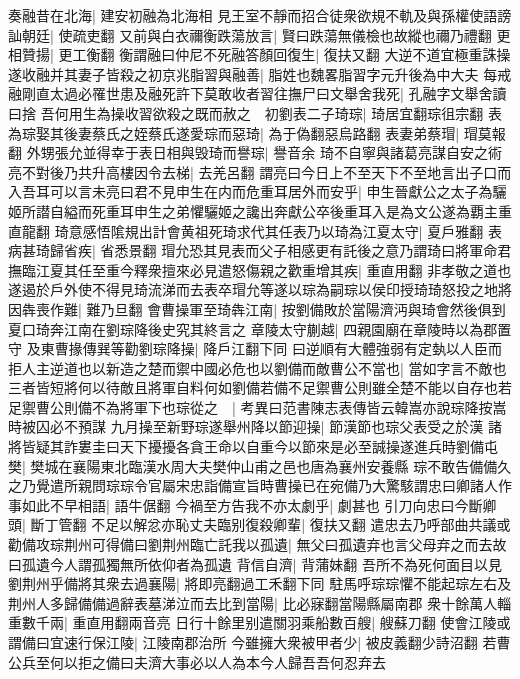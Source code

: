 奏融昔在北海|{
	建安初融為北海相}
見王室不靜而招合徒衆欲規不軌及與孫權使語謗訕朝廷|{
	使疏吏翻}
又前與白衣禰衡跌蕩放言|{
	賢曰跌蕩無儀檢也故縱也禰乃禮翻}
更相贊揚|{
	更工衡翻}
衡謂融曰仲尼不死融答顏回復生|{
	復扶又翻}
大逆不道宜極重誅操遂收融并其妻子皆殺之初京兆脂習與融善|{
	脂姓也魏畧脂習字元升後為中大夫}
每戒融剛直太過必罹世患及融死許下莫敢收者習往撫尸曰文舉舍我死|{
	孔融字文舉舍讀曰捨}
吾何用生為操收習欲殺之既而赦之　初劉表二子琦琮|{
	琦居宜翻琮徂宗翻}
表為琮娶其後妻蔡氏之姪蔡氏遂愛琮而惡琦|{
	為于偽翻惡烏路翻}
表妻弟蔡瑁|{
	瑁莫報翻}
外甥張允並得幸于表日相與毁琦而譽琮|{
	譽音余}
琦不自寧與諸葛亮謀自安之術亮不對後乃共升高樓因令去梯|{
	去羌呂翻}
謂亮曰今日上不至天下不至地言出子口而入吾耳可以言未亮曰君不見申生在内而危重耳居外而安乎|{
	申生晉獻公之太子為驪姬所譛自縊而死重耳申生之弟懼驪姬之讒出奔獻公卒後重耳入是為文公遂為覇主重直龍翻}
琦意感悟隂規出計會黄祖死琦求代其任表乃以琦為江夏太守|{
	夏戶雅翻}
表病甚琦歸省疾|{
	省悉景翻}
瑁允恐其見表而父子相感更有託後之意乃謂琦曰將軍命君撫臨江夏其任至重今釋衆擅來必見遣怒傷親之歡重增其疾|{
	重直用翻}
非孝敬之道也遂遏於戶外使不得見琦流涕而去表卒瑁允等遂以琮為嗣琮以侯印授琦琦怒投之地將因犇喪作難|{
	難乃旦翻}
會曹操軍至琦犇江南|{
	按劉備敗於當陽濟沔與琦會然後俱到夏口琦奔江南在劉琮降後史究其終言之}
章陵太守蒯越|{
	四親園廟在章陵時以為郡置守}
及東曹掾傳巽等勸劉琮降操|{
	降戶江翻下同}
曰逆順有大體強弱有定埶以人臣而拒人主逆道也以新造之楚而禦中國必危也以劉備而敵曹公不當也|{
	當如字言不敵也}
三者皆短將何以待敵且將軍自料何如劉備若備不足禦曹公則雖全楚不能以自存也若足禦曹公則備不為將軍下也琮從之　|{
	考異曰范書陳志表傳皆云韓嵩亦說琮降按嵩時被囚必不預謀}
九月操至新野琮遂舉州降以節迎操|{
	節漢節也琮父表受之於漢}
諸將皆疑其詐婁圭曰天下擾擾各貪王命以自重今以節來是必至誠操遂進兵時劉備屯樊|{
	樊城在襄陽東北臨漢水周大夫樊仲山甫之邑也唐為襄州安養縣}
琮不敢告備備久之乃覺遣所親問琮琮令官屬宋忠詣備宣旨時曹操已在宛備乃大驚駭謂忠曰卿諸人作事如此不早相語|{
	語牛倨翻}
今禍至方告我不亦太劇乎|{
	劇甚也}
引刀向忠曰今斷卿頭|{
	斷丁管翻}
不足以解忿亦恥丈夫臨别復殺卿輩|{
	復扶又翻}
遣忠去乃呼部曲共議或勸備攻琮荆州可得備曰劉荆州臨亡託我以孤遺|{
	無父曰孤遺弃也言父母弃之而去故曰孤遺今人謂孤獨無所依仰者為孤遺}
背信自濟|{
	背蒲妹翻}
吾所不為死何面目以見劉荆州乎備將其衆去過襄陽|{
	將即亮翻過工禾翻下同}
駐馬呼琮琮懼不能起琮左右及荆州人多歸備備過辭表墓涕泣而去比到當陽|{
	比必寐翻當陽縣屬南郡}
衆十餘萬人輜重數千兩|{
	重直用翻兩音亮}
日行十餘里别遣關羽乘船數百艘|{
	艘蘇刀翻}
使會江陵或謂備曰宜速行保江陵|{
	江陵南郡治所}
今雖擁大衆被甲者少|{
	被皮義翻少詩沼翻}
若曹公兵至何以拒之備曰夫濟大事必以人為本今人歸吾吾何忍弃去


